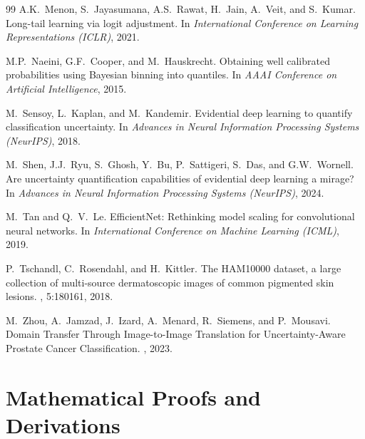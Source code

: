 \documentclass[letterpaper]{article} %
\begin{document}
\begin{thebibliography}{99}
A.K.~Menon, S.~Jayasumana, A.S.~Rawat, H.~Jain, A.~Veit, and S.~Kumar.
\newblock Long-tail learning via logit adjustment.
\newblock In {\em International Conference on Learning Representations (ICLR)}, 2021.

M.P.~Naeini, G.F.~Cooper, and M.~Hauskrecht.
\newblock Obtaining well calibrated probabilities using Bayesian binning into quantiles.
\newblock In {\em AAAI Conference on Artificial Intelligence}, 2015.

M.~Sensoy, L.~Kaplan, and M.~Kandemir.
\newblock Evidential deep learning to quantify classification uncertainty.
\newblock In {\em Advances in Neural Information Processing Systems (NeurIPS)}, 2018.

M.~Shen, J.J.~Ryu, S.~Ghosh, Y.~Bu, P.~Sattigeri, S.~Das, and G.W.~Wornell.
\newblock Are uncertainty quantification capabilities of evidential deep learning a mirage?
\newblock In {\em Advances in Neural Information Processing Systems (NeurIPS)}, 2024.

M.~Tan and Q.~V.~Le.
\newblock EfficientNet: Rethinking model scaling for convolutional neural networks.
\newblock In {\em International Conference on Machine Learning (ICML)}, 2019.

P.~Tschandl, C.~Rosendahl, and H.~Kittler.
\newblock The {HAM10000} dataset, a large collection of multi-source dermatoscopic images of common pigmented skin lesions.
, 5:180161, 2018.

M.~Zhou, A.~Jamzad, J.~Izard, A.~Menard, R.~Siemens, and P.~Mousavi.
\newblock Domain Transfer Through Image-to-Image Translation for Uncertainty-Aware Prostate Cancer Classification.
, 2023.

\end{thebibliography}

\appendix
\section{Mathematical Proofs and Derivations}
\end{document}
